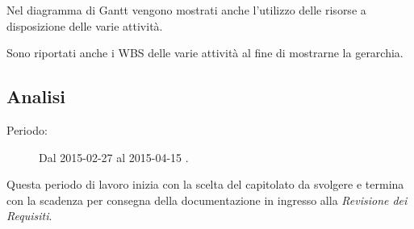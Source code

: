\noindent Nel diagramma di \gls{Gantt} vengono mostrati anche l'utilizzo delle risorse a disposizione delle varie attività.

\noindent Sono riportati anche i \gls{WBS} delle varie attività al fine di mostrarne la gerarchia.

\subsection{Analisi}
\begin{description}
	\item[Periodo:] Dal 2015-02-27 al 2015-04-15 .
\end{description}
Questa periodo di lavoro inizia con la scelta del capitolato da svolgere e termina con la scadenza per consegna della documentazione in ingresso alla \textit{Revisione dei Requisiti}. 

